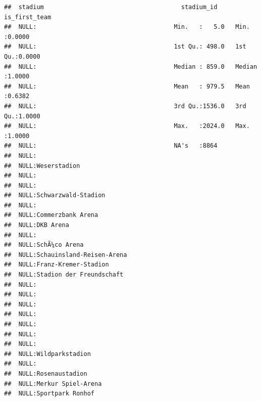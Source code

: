 \documentclass{article}\usepackage[]{graphicx}\usepackage[]{color}
\makeatletter
\newenvironment{kframe}{%
 \def\at@end@of@kframe{}%
 \ifinner\ifhmode%
  \def\at@end@of@kframe{\end{minipage}}%
  \begin{minipage}{\columnwidth}%
 \fi\fi%
 \def\FrameCommand##1{\hskip\@totalleftmargin \hskip-\fboxsep
 \colorbox{shadecolor}{##1}\hskip-\fboxsep
     \hskip-\linewidth \hskip-\@totalleftmargin \hskip\columnwidth}%
 \MakeFramed {\advance\hsize-\width
   \@totalleftmargin\z@ \linewidth\hsize
   \@setminipage}}%
 {\par\unskip\endMakeFramed%
 \at@end@of@kframe}
\newenvironment{knitrout}{}{} %
\makeatother
\begin{document}
\begin{knitrout}
\begin{kframe}
\begin{verbatim}
##  stadium                                      stadium_id     is_first_team   
##  NULL:                                      Min.   :   5.0   Min.   :0.0000  
##  NULL:                                      1st Qu.: 498.0   1st Qu.:0.0000  
##  NULL:                                      Median : 859.0   Median :1.0000  
##  NULL:                                      Mean   : 979.5   Mean   :0.6382  
##  NULL:                                      3rd Qu.:1536.0   3rd Qu.:1.0000  
##  NULL:                                      Max.   :2024.0   Max.   :1.0000  
##  NULL:                                      NA's   :8864                     
##  NULL:                                                                       
##  NULL:Weserstadion                                                           
##  NULL:                                                                       
##  NULL:                                                                       
##  NULL:Schwarzwald-Stadion                                                    
##  NULL:                                                                       
##  NULL:Commerzbank Arena                                                      
##  NULL:DKB Arena                                                              
##  NULL:                                                                       
##  NULL:SchÃ¼co Arena                                                          
##  NULL:Schauinsland-Reisen-Arena                                              
##  NULL:Franz-Kremer-Stadion                                                   
##  NULL:Stadion der Freundschaft                                               
##  NULL:                                                                       
##  NULL:                                                                       
##  NULL:                                                                       
##  NULL:                                                                       
##  NULL:                                                                       
##  NULL:                                                                       
##  NULL:                                                                       
##  NULL:Wildparkstadion                                                        
##  NULL:                                                                       
##  NULL:Rosenaustadion                                                         
##  NULL:Merkur Spiel-Arena                                                     
##  NULL:Sportpark Ronhof                                                       

\end{verbatim}
\end{kframe}
\end{knitrout}
\end{document}
